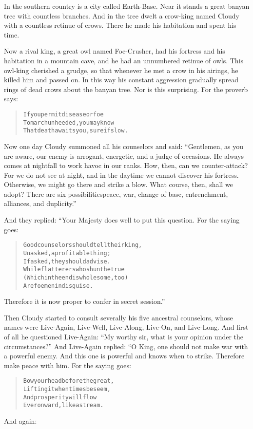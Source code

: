 \documentclass[article, twoside, 14pt]{memoir}
\renewenvironment{verbatim}{%
\begin{quote}%
\vskip -10pt%
\begin{alltt}\normalfont\large}{\end{alltt}%
\end{quote}%
\vskip -10pt
} %
\begin{document}
In the southern country is a city called Earth-Base.
\label{s47}Near it stands a great banyan tree with countless
branches. And in the tree dwelt a crow-king named Cloudy with a
countless retinue of crows. There he made his habitation and spent
his time.

Now a rival king, a great owl named Foe-Crusher, had his fortress
and his habitation in a mountain cave, and he had an unnumbered
retinue of owls. This owl-king cherished a grudge, so that whenever
he met a crow in his airings, he killed him and passed on. In this
way his constant aggression gradually spread rings of dead crows
about the banyan tree. Nor is this surprising. For the proverb
says:

\begin{verbatim}
If you permit disease or foe
To march unheeded, you may know
That death awaits you, sure if slow.
\end{verbatim}
Now one day Cloudy summoned all his counselors and said:
``Gentlemen, as you are aware, our enemy is arrogant, energetic, and a judge of occasions. He always comes at nightfall to work havoc in our ranks. How, then, can we counter-attack? For we do not see at night, and in the daytime we cannot discover his fortress. Otherwise, we might go there and strike a blow. What course, then, shall we adopt? There are six possibilities{\textemdash}peace, war, change of base, entrenchment, alliances, and duplicity.''

And they replied: “Your Majesty does well to put this question. For
the saying goes:

\begin{verbatim}
Good counselors should tell their king,
Unasked, a profitable thing;
    If asked, they should advise.
While flatterers who shun the true
(Which in the end is wholesome, too)
    Are foemen in disguise.
\end{verbatim}
Therefore it is now proper to confer in secret session.”

Then Cloudy started to consult severally his five ancestral
counselors, whose names were Live-Again, Live-Well, Live-Along,
Live-On, and Live-Long. And first of all he questioned Live-Again:
``My worthy sir, what is your opinion under the circumstances?''
And Live-Again replied: “O King, one should not make war with a
powerful enemy. And this one is powerful and knows when to strike.
Therefore make peace with him. For the saying goes:

\begin{verbatim}
Bow your head before the great,
    Lifting it when times beseem,
And prosperity will flow
    Ever onward, like a stream.
\end{verbatim}
And again:
\end{document}
